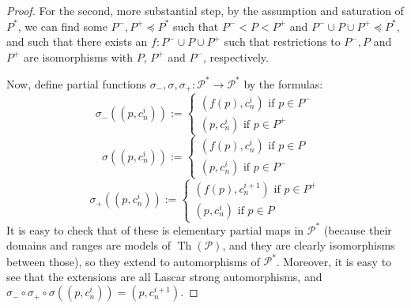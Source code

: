 \documentclass[final,a4paper,12pt]{amsart}
\DeclareMathOperator{\Th}{{Th}}
\theoremstyle{remark}
\theoremstyle{definition}
\begin{document}
\begin{proof}
		For the second, more substantial step, by the assumption and saturation of $P^*$, we can find some $P^-,P^+\preceq P^*$ such that $P^-<P<P^+$ and $P^-\cup P\cup P^+\preceq P^*$, and such that there exists an $f\colon P^-\cup P\cup P^+$ such that restrictions to $P^-,P$ and $P^+$ are isomorphisms with $P$, $P^+$ and $P^-$, respectively.
		
		Now, define partial functions $\sigma_-,\sigma,\sigma_+\colon \mathcal P^*\to \mathcal P^*$ by the formulas:
		\[
		\sigma_-((p,c_n^i)):=\begin{cases} (f(p),c_n^i)\textrm{ if }p\in P^-\\ (p,c_n^i)\textrm{ if }p\in P^+ \end{cases}
		\]
		\[
		\sigma((p,c_n^i)):=\begin{cases} (f(p),c_n^i)\textrm{ if }p\in P\\ (p,c_n^i)\textrm{ if }p\in P^- \end{cases}
		\]
		\[
		\sigma_+((p,c_n^i)):=\begin{cases} (f(p),c_n^{i+1})\textrm{ if }p\in P^+\\ (p,c_n^i)\textrm{ if }p\in P \end{cases}
		\]
		It is easy to check that of these is elementary partial maps in $\mathcal P^*$ (because their domains and ranges are models of $\Th(\mathcal P)$, and they are clearly isomorphisms between those), so they extend to automorphisms of $\mathcal P^*$. Moreover, it is easy to see that the extensions are all Lascar strong automorphisms, and $\sigma_-\circ\sigma_+\circ\sigma((p,c_n^i))=(p,c_n^{i+1})$.
	\end{proof}
	
\end{document}
